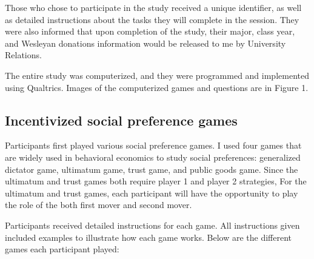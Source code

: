 \documentclass[12pt]{article}
\begin{document}
Those who chose to participate in the study received a unique identifier, as well as detailed instructions about the tasks they will complete in the session. They were also informed that upon completion of the study, their major, class year, and Wesleyan donations information would be released to me by University Relations.

The entire study was computerized, and they were programmed and implemented using Qualtrics. Images of the computerized games and questions are in Figure 1.


\subsection{Incentivized social preference games}

Participants first played various social preference games. I used four games that are widely used in behavioral economics to study social preferences: generalized dictator game, ultimatum game, trust game, and public goods game. {\color{red}Since the ultimatum and trust games both require player 1 and player 2 strategies, For the ultimatum and trust games, each participant will have the opportunity to play the role of the both first mover and second mover. }


Participants received detailed instructions for each game. All instructions given included examples to illustrate how each game works. Below are the different games each participant played: 
\end{document}
